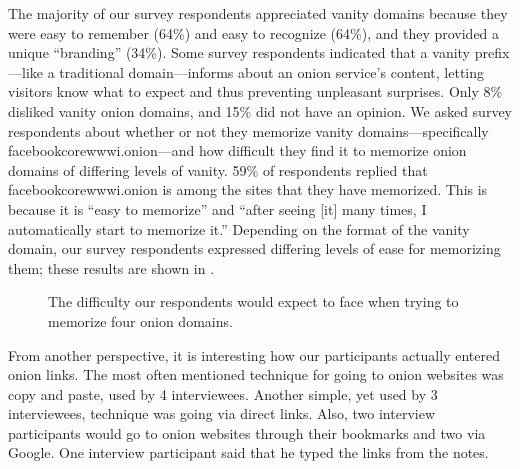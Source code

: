 The majority of our survey respondents appreciated vanity domains because they were easy
to remember (64\%) and easy to recognize (64\%), and they provided a unique
``branding'' (34\%).  Some survey respondents indicated that a vanity prefix---like a
traditional domain---informs about an onion service's content, letting visitors
know what to expect and thus preventing unpleasant surprises.  Only 8\% disliked
vanity onion domains, and 15\% did not have an opinion.  We asked survey respondents
about whether or not they memorize vanity domains---specifically
facebookcorewwwi.onion---and how difficult they find it to memorize onion
domains of differing levels of vanity.  59\% of respondents replied that
facebookcorewwwi.onion is among the sites that they have memorized.  This is 
because it is ``easy to memorize'' and ``after seeing [it] many times, I
automatically start to memorize it.'' Depending on the format of the vanity domain, our survey respondents expressed differing levels of ease for
memorizing them; these results are shown in .

\begin{figure}[t]
    \centering
    
    \caption{The difficulty our respondents would expect to face when trying to
    memorize four onion domains.}
    \label{fig:memorize-domains}
\end{figure}

From another perspective, it is interesting how our participants actually entered onion links. The most often mentioned technique for going to onion websites was copy and paste, used by 4 interviewees. Another simple, yet used by 3 interviewees, technique was going via direct links.  Also, two interview participants would go to onion websites through their bookmarks and two via Google. One interview participant said that he typed the links from the notes.







